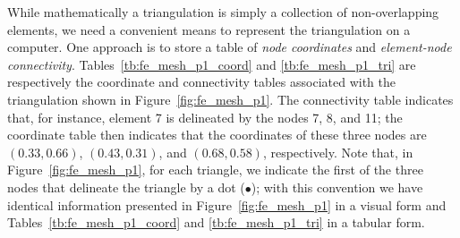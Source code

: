 While mathematically a triangulation is simply a collection of non-overlapping elements, we need a convenient means to represent the triangulation on a computer.  One approach is to store a table of \emph{node coordinates} and \emph{element-node connectivity}.  Tables~\ref{tb:fe_mesh_p1_coord} and \ref{tb:fe_mesh_p1_tri} are respectively the coordinate and connectivity tables associated with the triangulation shown in Figure~\ref{fig:fe_mesh_p1}. The connectivity table indicates that, for instance, element 7 is delineated by the nodes 7, 8, and 11; the coordinate table then indicates that the coordinates of these three nodes are $(0.33,0.66)$, $(0.43,0.31)$, and $(0.68,0.58)$, respectively.  Note that, in Figure~\ref{fig:fe_mesh_p1}, for each triangle, we indicate the first of the three nodes that delineate the triangle by a dot ($\bullet$); with this convention we have identical information presented in Figure~\ref{fig:fe_mesh_p1} in a visual form and Tables~\ref{tb:fe_mesh_p1_coord} and \ref{tb:fe_mesh_p1_tri} in a tabular form.

